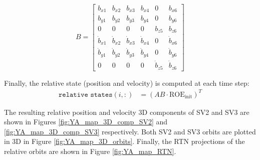 \[
B =
\begin{bmatrix}
b_{x1} & b_{x2} & b_{x3} & b_{x4} & 0     & b_{x6} \\
b_{y1} & b_{y2} & b_{y3} & b_{y4} & 0     & b_{y6} \\
0      & 0      & 0      & 0      & b_{z5} & b_{z6} \\
\dot{b}_{x1} & \dot{b}_{x2} & \dot{b}_{x3} & \dot{b}_{x4} & 0 & \dot{b}_{x6} \\
\dot{b}_{y1} & \dot{b}_{y2} & \dot{b}_{y3} & \dot{b}_{y4} & 0 & \dot{b}_{y6} \\
0      & 0      & 0      & 0      & \dot{b}_{z5} & \dot{b}_{z6}
\end{bmatrix}
\]

Finally, the relative state (position and velocity) is computed at each time step:
\begin{align}
\texttt{relative states}(i, :) &= (A B \cdot \text{ROE}_{\text{init}})^T
\end{align}

The resulting relative position and velocity 3D components of SV2 and SV3 are shown in Figures \ref{fig:YA_map_3D_comp_SV2} and \ref{fig:YA_map_3D_comp_SV3} respectively. Both SV2 and SV3 orbits are plotted in 3D in Figure \ref{fig:YA_map_3D_orbits}. Finally, the RTN projections of the relative orbits are shown in Figure \ref{fig:YA_map_RTN}.

